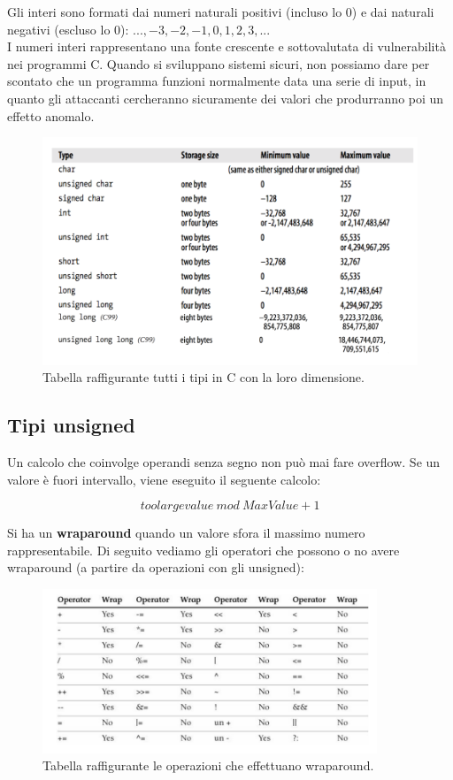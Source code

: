 Gli interi sono formati dai numeri naturali positivi (incluso lo 0) e dai naturali
negativi (escluso lo 0): $..., -3, -2, -1, 0, 1, 2, 3, ...$\\
I numeri interi rappresentano una fonte crescente e sottovalutata di vulnerabilità
nei programmi C. Quando si sviluppano sistemi sicuri, non possiamo dare per scontato
che un programma funzioni normalmente data una serie di input,
in quanto gli attaccanti cercheranno sicuramente dei valori che produrranno
poi un effetto anomalo.

\begin{figure}[H]
    \centering
    \includegraphics[width=13cm, keepaspectratio]{capitoli/secure_coding/img/cap_2/vari_tipi.png}
    \caption{Tabella raffigurante tutti i tipi in C con la loro dimensione.}\label{fig:vari_tipi}
\end{figure}

\subsection{Tipi unsigned}

Un calcolo che coinvolge operandi senza segno non può mai fare overflow.
Se un valore è fuori intervallo, viene eseguito il seguente calcolo:

\[
    toolargevalue \ mod \ MaxValue + 1
\]

Si ha un \textbf{wraparound} quando un valore sfora il massimo numero
rappresentabile. Di seguito vediamo gli operatori che possono o no avere
wraparound (a partire da operazioni con gli unsigned):

\begin{figure}[H]
    \centering
    \includegraphics[width=10cm, keepaspectratio]{capitoli/secure_coding/img/cap_2/wraparound.png}
    \caption{Tabella raffigurante le operazioni che effettuano wraparound.}
\end{figure}

